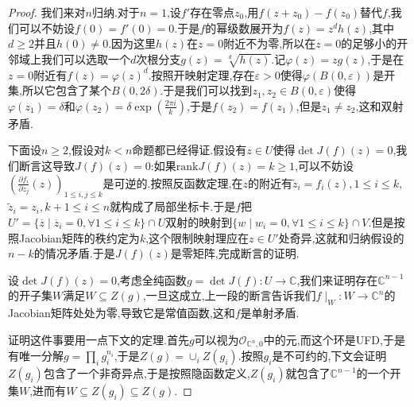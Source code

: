 \begin{enumerate}
\begin{proof}
    	我们来对$n$归纳.对于$n=1$,设$f'$存在零点$z_0$,用$f(z+z_0)-f(z_0)$替代$f$,我们可以不妨设$f(0)=f'(0)=0$.于是$f$的幂级数展开为$f(z)=z^dh(z)$,其中$d\ge2$并且$h(0)\not=0$.因为这里$h(z)$在$z=0$附近不为零,所以在$z=0$的足够小的开邻域上我们可以选取一个$d$次根分支$g(z)=\sqrt[d]{h(z)}$.记$\varphi(z)=zg(z)$,于是在$z=0$附近有$f(z)=\varphi(z)^d$.按照开映射定理,存在$\varepsilon>0$使得$\varphi(B(0,\varepsilon))$是开集,所以它包含了某个$B(0,2\delta)$.于是我们可以找到$z_1,z_2\in B(0,\varepsilon)$使得$\varphi(z_1)=\delta$和$\varphi(z_2)=\delta\exp\left(\frac{2\pi i}{k}\right)$,于是$f(z_2)=f(z_1)$,但是$z_1\not=z_2$,这和双射矛盾.
    	
    	\qquad
    	
    	下面设$n\ge2$,假设对$k<n$命题都已经得证.假设有$z\in U$使得$\det J(f)(z)=0$,我们断言这导致$J(f)(z)=0$:如果$\mathrm{rank}J(f)(z)=k\ge1$,可以不妨设$\left(\frac{\partial f_i}{\partial z_j}(z)\right)_{1\le i,j\le k}$是可逆的.按照反函数定理,在$z$的附近有$\widetilde{z}_i=f_i(z),1\le i\le k$,$\widetilde{z}_i=z_i,k+1\le i\le n$就构成了局部坐标卡.于是$f$把$U'=\{\overline{z}\mid\overline{z}_i=0,\forall1\le i\le k\}\cap U$双射的映射到$\{w\mid w_i=0,\forall1\le i\le k\}\cap V$.但是按照Jacobian矩阵的秩约定为$k$,这个限制映射理应在$z\in U'$处奇异,这就和归纳假设的$n-k$的情况矛盾.于是$J(f)(z)$是零矩阵,完成断言的证明.
    	
    	\qquad
    	
    	设$\det J(f)(z)=0$,考虑全纯函数$g=\det J(f):U\to\mathbb{C}$,我们来证明存在$\mathbb{C}^{n-1}$的开子集$W$满足$W\subseteq Z(g)$,一旦这成立,上一段的断言告诉我们$f\mid_W:W\to\mathbb{C}^n$的Jacobian矩阵处处为零,导致它是常值函数,这和$f$是单射矛盾.
    	
    	\qquad
    	
    	证明这件事要用一点下文的定理.首先$g$可以视为$\mathscr{O}_{\mathbb{C}^n,0}$中的元,而这个环是UFD,于是有唯一分解$g=\prod_ig_i^{n_i}$,于是$Z(g)=\cup_iZ(g_i)$.按照$g_i$是不可约的,下文会证明$Z(g_i)$包含了一个非奇异点,于是按照隐函数定义,$Z(g_i)$就包含了$\mathbb{C}^{n-1}$的一个开集$W$,进而有$W\subseteq Z(g_i)\subseteq Z(g)$.    	
    \end{proof}
\end{enumerate}

